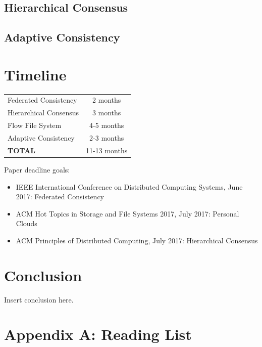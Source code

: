 \documentclass{article}
\begin{document}
\subsection{Hierarchical Consensus}

\subsection{Adaptive Consistency}

\section{Timeline}

\begin{center}
\begin{tabular}{|l|c|}
\hline
Federated Consistency & 2 months \\
Hierarchical Consensus & 3 months \\
Flow File System & 4-5 months \\
Adaptive Consistency & 2-3 months \\
\hline
\textbf{TOTAL} & 11-13 months \\
\hline
\end{tabular}
\end{center}

Paper deadline goals:

\begin{itemize}
\item IEEE International Conference on Distributed Computing Systems, June 2017: Federated Consistency
\item ACM Hot Topics in Storage and File Systems 2017, July 2017: Personal Clouds
\item ACM Principles of Distributed Computing, July 2017: Hierarchical Consensus
\end{itemize}


\section{Conclusion}

Insert conclusion here.

\newpage

\appendix
\section{Appendix A: Reading List}
\label{app:readinglist}
\end{document}
